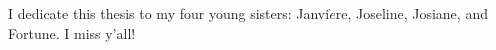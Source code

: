 \begin{dedication}

I dedicate this thesis to my four young sisters: \newline Janvi$\grave{e}$re, Joseline, Josiane, and Fortune. I miss y'all!













\end{dedication}